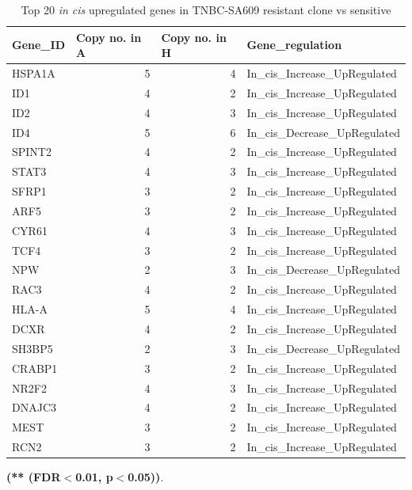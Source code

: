  \begin{table}[htbp]
   \centering
   \caption{Top 20 \textit{in cis} upregulated genes in TNBC-SA609 resistant clone vs sensitive}
     
     \begin{tabular}{|l|r|r|l|}
     \hline
     \textbf{Gene\_ID} & \multicolumn{1}{|l|}{ \textbf{Copy no. in A}}& \multicolumn{1}{|l|}{ \textbf{Copy no. in H}} &  \textbf{Gene\_regulation} \\
     \hline
     HSPA1A & 5 & 4 & In\_cis\_Increase\_UpRegulated \\
     ID1 & 4 & 2 & In\_cis\_Increase\_UpRegulated \\
     ID2 & 4 & 3 & In\_cis\_Increase\_UpRegulated \\
     ID4 & 5 & 6 & In\_cis\_Decrease\_UpRegulated \\
     SPINT2 & 4 & 2 & In\_cis\_Increase\_UpRegulated \\
     STAT3 & 4 & 3 & In\_cis\_Increase\_UpRegulated \\
     SFRP1 & 3 & 2 & In\_cis\_Increase\_UpRegulated \\
     ARF5 & 3 & 2 & In\_cis\_Increase\_UpRegulated \\
     CYR61 & 4 & 3 & In\_cis\_Increase\_UpRegulated \\
     TCF4 & 3 & 2 & In\_cis\_Increase\_UpRegulated \\
     NPW & 2 & 3 & In\_cis\_Decrease\_UpRegulated \\
     RAC3 & 4 & 2 & In\_cis\_Increase\_UpRegulated \\
     HLA-A & 5 & 4 & In\_cis\_Increase\_UpRegulated \\
     DCXR & 4 & 2 & In\_cis\_Increase\_UpRegulated \\
     SH3BP5 & 2 & 3 & In\_cis\_Decrease\_UpRegulated \\
     CRABP1 & 3 & 2 & In\_cis\_Increase\_UpRegulated \\
     NR2F2 & 4 & 3 & In\_cis\_Increase\_UpRegulated \\
     DNAJC3 & 4 & 2 & In\_cis\_Increase\_UpRegulated \\
     MEST & 3 & 2 & In\_cis\_Increase\_UpRegulated \\
     RCN2 & 3 & 2 & In\_cis\_Increase\_UpRegulated \\
     \hline
     \end{tabular}%
  \label{tab:top20SA609upregulated}%
   
    \small\textbf{(** (FDR$<$0.01, p$<$0.05))}.
 \end{table}%
